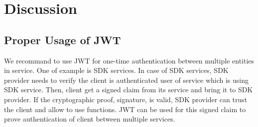 \documentclass[journal,article,submit,moreauthors,pdftex,10pt,a4paper]{mdpi}
\begin{document}






\section{Discussion}
\subsection{Proper Usage of JWT}
We recommand to use JWT for one-time authentication between multiple entities in service. One of example is SDK services. In case of SDK services, SDK provider needs to verify the client is authenticated user of service which is using SDK service. Then, client get a signed claim from its service and bring it to SDK provider. If the cryptographic proof, signature, is valid, SDK provider can trust the client and allow to use functions. JWT can be used for this signed claim to prove authentication of client between multiple services.
\end{document}
